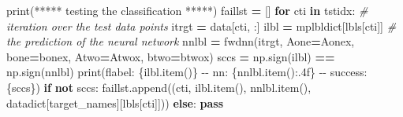 \documentclass[
]{book}
\newenvironment{Shaded}{\begin{snugshade}}{\end{snugshade}}
\newcommand{\BuiltInTok}[1]{#1}
\newcommand{\CommentTok}[1]{\textcolor[rgb]{0.56,0.35,0.01}{\textit{#1}}}
\newcommand{\ControlFlowTok}[1]{\textcolor[rgb]{0.13,0.29,0.53}{\textbf{#1}}}
\newcommand{\KeywordTok}[1]{\textcolor[rgb]{0.13,0.29,0.53}{\textbf{#1}}}
\newcommand{\NormalTok}[1]{#1}
\newcommand{\OperatorTok}[1]{\textcolor[rgb]{0.81,0.36,0.00}{\textbf{#1}}}
\newcommand{\SpecialCharTok}[1]{\textcolor[rgb]{0.00,0.00,0.00}{#1}}
\newcommand{\SpecialStringTok}[1]{\textcolor[rgb]{0.31,0.60,0.02}{#1}}
\newcommand{\StringTok}[1]{\textcolor[rgb]{0.31,0.60,0.02}{#1}}
\theoremstyle{definition}
\theoremstyle{definition}
\theoremstyle{definition}
\theoremstyle{definition}
\theoremstyle{remark}
\begin{document}
\begin{Shaded}
\begin{Highlighting}[]
\BuiltInTok{print}\NormalTok{(}\StringTok{\textquotesingle{}***** testing the classification *****\textquotesingle{}}\NormalTok{)}
\NormalTok{faillst }\OperatorTok{=}\NormalTok{ []}
\ControlFlowTok{for}\NormalTok{ cti }\KeywordTok{in}\NormalTok{ tstidx:  }\CommentTok{\# iteration over the test data points}
\NormalTok{    itrgt }\OperatorTok{=}\NormalTok{ data[cti, :]}
\NormalTok{    ilbl }\OperatorTok{=}\NormalTok{ mplbldict[lbls[cti]]}
    \CommentTok{\# the prediction of the neural network}
\NormalTok{    nnlbl }\OperatorTok{=}\NormalTok{ fwdnn(itrgt, Aone}\OperatorTok{=}\NormalTok{Aonex, bone}\OperatorTok{=}\NormalTok{bonex, Atwo}\OperatorTok{=}\NormalTok{Atwox, btwo}\OperatorTok{=}\NormalTok{btwox)}
\NormalTok{    sccs }\OperatorTok{=}\NormalTok{ np.sign(ilbl) }\OperatorTok{==}\NormalTok{ np.sign(nnlbl)}
    \BuiltInTok{print}\NormalTok{(}\SpecialStringTok{f\textquotesingle{}label: }\SpecialCharTok{\{}\NormalTok{ilbl}\SpecialCharTok{.}\NormalTok{item()}\SpecialCharTok{\}}\SpecialStringTok{ {-}{-} nn: }\SpecialCharTok{\{}\NormalTok{nnlbl}\SpecialCharTok{.}\NormalTok{item()}\SpecialCharTok{:.4f\}}\SpecialStringTok{ {-}{-} success: }\SpecialCharTok{\{}\NormalTok{sccs}\SpecialCharTok{\}}\SpecialStringTok{\textquotesingle{}}\NormalTok{)}
    \ControlFlowTok{if} \KeywordTok{not}\NormalTok{ sccs:}
\NormalTok{        faillst.append((cti, ilbl.item(), nnlbl.item(),}
\NormalTok{                        datadict[}\StringTok{\textquotesingle{}target\_names\textquotesingle{}}\NormalTok{][lbls[cti]]))}
    \ControlFlowTok{else}\NormalTok{:}
        \ControlFlowTok{pass}
\end{Highlighting}
\end{Shaded}
\end{document}
